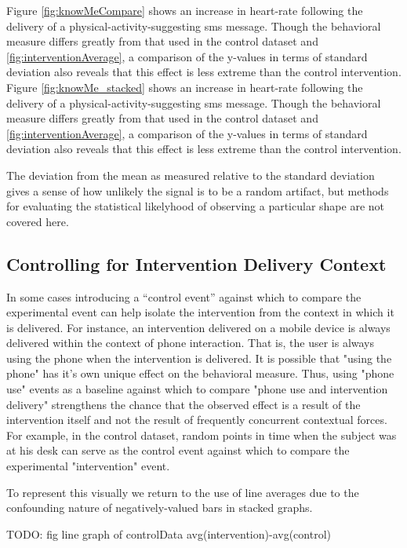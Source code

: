 \documentclass[review,journal]{vgtc}         %
\begin{document}
Figure \ref{fig:knowMeCompare} shows an increase in heart-rate following the delivery of a physical-activity-suggesting sms message.
Though the behavioral measure differs greatly from that used in the control dataset and \ref{fig:interventionAverage}, a comparison of the y-values in terms of standard deviation also reveals that this effect is less extreme than the control intervention.
Figure \ref{fig:knowMe_stacked} shows an increase in heart-rate following the delivery of a physical-activity-suggesting sms message. Though the behavioral measure differs greatly from that used in the control dataset and \ref{fig:interventionAverage}, a comparison of the y-values in terms of standard deviation also reveals that this effect is less extreme than the control intervention.

The deviation from the mean as measured relative to the standard deviation gives a sense of how unlikely the signal is to be a random artifact, but methods for evaluating the statistical likelyhood of observing a particular shape are not covered here.

\subsection{Controlling for Intervention Delivery Context}
In some cases introducing a “control event” against which to compare the experimental event can help isolate the intervention from the context in which it is delivered.
For instance, an intervention delivered on a mobile device is always delivered within the context of phone interaction.
That is, the user is always using the phone when the intervention is delivered.
It is possible that "using the phone" has it's own unique effect on the behavioral measure.
Thus, using "phone use" events as a baseline against which to compare "phone use and intervention delivery" strengthens the chance that the observed effect is a result of the intervention itself and not the result of frequently concurrent contextual forces.
For example, in the control dataset, random points in time when the subject was at his desk can serve as the control event against which to compare the experimental "intervention" event.

To represent this visually we return to the use of line averages due to the confounding nature of negatively-valued bars in stacked graphs.

TODO: fig line graph of controlData avg(intervention)-avg(control)
\end{document}
